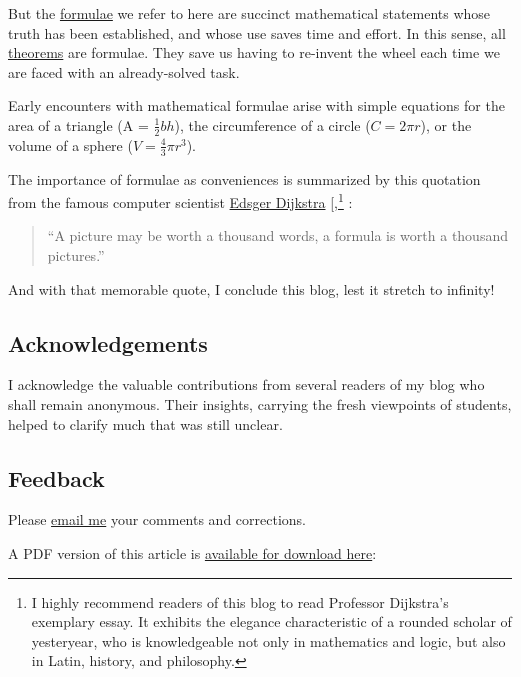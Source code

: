\documentclass[
  a4paper,
]{article}
\begin{document}
But the \href{https://en.wikipedia.org/wiki/Formula}{formulae} we refer
to here are succinct mathematical statements whose truth has been
established, and whose use saves time and effort. In this sense, all
\href{https://en.wikipedia.org/wiki/Formula}{theorems} are formulae.
They save us having to re-invent the wheel each time we are faced with
an already-solved task.

Early encounters with mathematical formulae arise with simple equations
for the area of a triangle (A = \(\frac{1}{2}bh\)), the circumference of
a circle (\(C = 2\pi r\)), or the volume of a sphere
(\(V = \frac{4}{3}\pi r^3\)).

The importance of formulae as conveniences is summarized by this
quotation from the famous computer scientist
\href{https://en.wikipedia.org/wiki/Edsger_W._Dijkstra}{Edsger Dijkstra}
{[},\citeproc{ref-dijkstra-html}{6}{]}\footnote{I
  highly recommend readers of this blog to read Professor Dijkstra's
  exemplary essay. It exhibits the elegance characteristic of a rounded
  scholar of yesteryear, who is knowledgeable not only in mathematics
  and logic, but also in Latin, history, and philosophy.} :

\begin{quote}
``A picture may be worth a thousand words, a formula is worth a thousand
pictures.''
\end{quote}

And with that memorable quote, I conclude this blog, lest it stretch to
infinity!

\subsection{Acknowledgements}\label{acknowledgements}

I acknowledge the valuable contributions from several readers of my blog
who shall remain anonymous. Their insights, carrying the fresh
viewpoints of students, helped to clarify much that was still unclear.

\subsection{Feedback}\label{feedback}

Please \href{mailto:feedback.swanlotus@gmail.com}{email me} your
comments and corrections.

\noindent A PDF version of this article is
\href{./expressions-equations-formulae.pdf}{available for download
here}:
\end{document}
